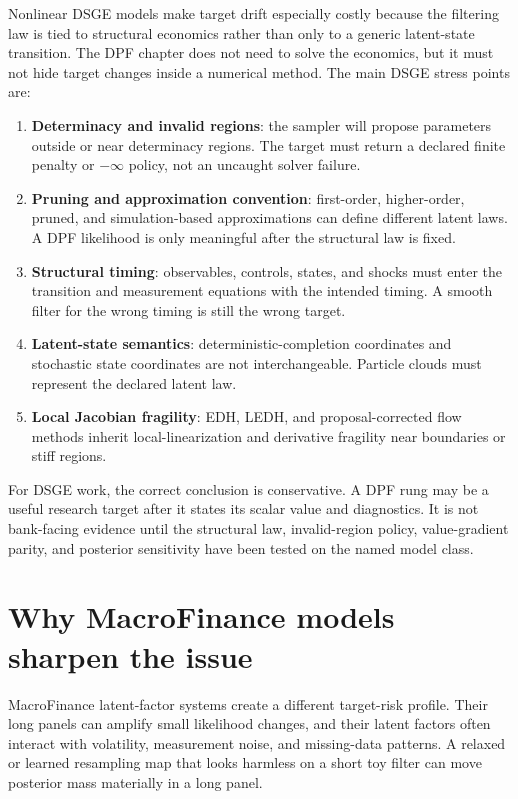 Nonlinear DSGE models make target drift especially costly because the filtering
law is tied to structural economics rather than only to a generic latent-state
transition.  The DPF chapter does not need to solve the economics, but it must
not hide target changes inside a numerical method.  The main DSGE stress points
are:
\begin{enumerate}[label=(\roman*)]
  \item \textbf{Determinacy and invalid regions}: the sampler will propose
    parameters outside or near determinacy regions.  The target must return a
    declared finite penalty or $-\infty$ policy, not an uncaught solver failure.
  \item \textbf{Pruning and approximation convention}: first-order, higher-order,
    pruned, and simulation-based approximations can define different latent
    laws.  A DPF likelihood is only meaningful after the structural law is
    fixed.
  \item \textbf{Structural timing}: observables, controls, states, and shocks
    must enter the transition and measurement equations with the intended
    timing.  A smooth filter for the wrong timing is still the wrong target.
  \item \textbf{Latent-state semantics}: deterministic-completion coordinates
    and stochastic state coordinates are not interchangeable.  Particle clouds
    must represent the declared latent law.
  \item \textbf{Local Jacobian fragility}: EDH, LEDH, and proposal-corrected
    flow methods inherit local-linearization and derivative fragility near
    boundaries or stiff regions.
\end{enumerate}

For DSGE work, the correct conclusion is conservative.  A DPF rung may be a
useful research target after it states its scalar value and diagnostics.  It is
not bank-facing evidence until the structural law, invalid-region policy,
value-gradient parity, and posterior sensitivity have been tested on the named
model class.

\section{Why MacroFinance models sharpen the issue}
\label{sec:bf-dpf-hmc-macrofinance}

MacroFinance latent-factor systems create a different target-risk profile.
Their long panels can amplify small likelihood changes, and their latent
factors often interact with volatility, measurement noise, and missing-data
patterns.  A relaxed or learned resampling map that looks harmless on a short
toy filter can move posterior mass materially in a long panel.

